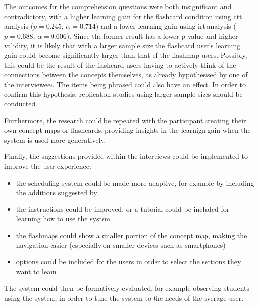 The outcomes for the comprehension questions were both insignificant and contradictory, with a higher learning gain for the flashcard condition using ctt analysis ($p=0.245$, $\alpha=0.714$) and a lower learning gain using irt analysis ($p=0.688$, $\alpha=0.606$). Since the former result has a lower p-value and higher validity, it is likely that with a larger sample size the flashcard user's learning gain could become significantly larger than that of the flashmap users. Possibly, this could be the result of the flashcard users having to actively think of the connections between the concepts themselves, as already hypothesised by one of the interviewees. The items being phrased could also have an effect. In order to confirm this hypothesis, replication studies using larger sample sizes should be conducted.

Furthermore, the research could be repeated with the participant creating their own concept maps or flashcards, providing insights in the learnign gain when the system is used more generatively.

Finally, the suggestions provided within the interviews could be implemented to improve the user experience:
%
\begin{itemize}
    \item the scheduling system could be made more adaptive, for example by including the additions suggested by 
    \item the instructions could be improved, or a tutorial could be included for learning how to use the system
    \item the flashmaps could show a smaller portion of the concept map, making the navigation easier (especially on smaller devices such as smartphones)
    \item options could be included for the users in order to select the sections they want to learn
\end{itemize}
%
The system could then be formatively evaluated, for example observing students using the system, in order to tune the system to the needs of the average user.
